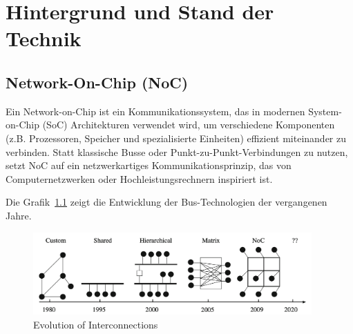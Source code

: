 \chapter{Hintergrund und Stand der Technik}

\section{Network-On-Chip (NoC)}
Ein Network-on-Chip ist ein Kommunikationssystem, das in modernen System-on-Chip (SoC) Architekturen verwendet wird, um verschiedene Komponenten (z.B. Prozessoren, Speicher und spezialisierte Einheiten) effizient miteinander zu verbinden. Statt klassische Busse oder Punkt-zu-Punkt-Verbindungen zu nutzen, setzt NoC auf ein netzwerkartiges Kommunikationsprinzip, das von Computernetzwerken oder Hochleistungsrechnern inspiriert ist. 

Die Grafik~\ref{fig:Evolution_of_Interconnection} zeigt die Entwicklung der Bus-Technologien der vergangenen Jahre.
\begin{figure}[htbp]
    \centering
    \includegraphics[width=0.95\textwidth]{img/Evolution of On-Chip communication interconnect.png}
    \caption{Evolution of Interconnections~\cite{BenAbdallah2013}}  \label{fig:Evolution_of_Interconnection}
\end{figure}

